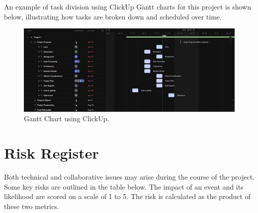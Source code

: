 \documentclass{article} %
\begin{document}
An example of task division using ClickUp Gantt charts for this project is shown below, illustrating how tasks are broken down and scheduled over time.

\begin{figure}[h]
\begin{center}
\includegraphics[width=1\textwidth]{Figs/gantt.jpg}
\end{center}
\caption{Gantt Chart using ClickUp.}
\end{figure} 

\section{Risk Register}

Both technical and collaborative issues may arise during the course of the project. Some key risks are outlined in the table below. The impact of an event and its likelihood are scored on a scale of 1 to 5. The risk is calculated as the product of these two metrics.

\newpage

\renewcommand{\arraystretch}{1.4}
\end{document}
